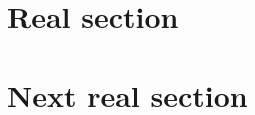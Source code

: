 \documentclass{article}
\begin{document}
\section{Real section}

\begin{comment}
\section{Commented section}
\subsection{Commented subsection}
\subsubsection{Commented subsubsection}
\end{comment}

\begin{comment}
\begin{figure} \label{fig:commented}
\end{figure}
\end{comment}

\section{Next real section}
\end{document}
